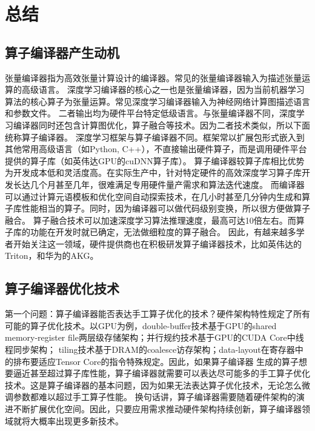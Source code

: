 
\chapter{总结}

\section{算子编译器产生动机}
张量编译器指为高效张量计算设计的编译器\cite{halide,kjolstad:2017:taco}。常见的张量编译器输入为描述张量运算的高级语言。
深度学习编译器\cite{tvm,rammer}的核心之一也是张量编译器，因为当前机器学习算法的核心算子为张量运算。常见深度学习编译器输入为神经网络计算图描述语言和参数文件。
二者输出均为硬件平台特定低级语言。与张量编译器不同，深度学习编译器同时还包含计算图优化，算子融合等技术。因为二者技术类似，所以下面统称算子编译器。
深度学习框架\cite{tensorflow,pytorch}与算子编译器不同。框架常以扩展包形式嵌入到其他常用高级语言（如Python, C++），不直接输出硬件算子，而是调用硬件平台提供的算子库（如英伟达GPU的cuDNN算子库\cite{cuDNN}）。
算子编译器较算子库相比优势为开发成本低和灵活度高。在实际生产中，针对特定硬件的高效深度学习算子库开发长达几个月甚至几年，很难满足专用硬件量产需求和算法迭代速度\cite{Heron}。
而编译器可以通过计算元语模板和优化空间自动探索技术，在几小时甚至几分钟内生成和算子库性能相当的算子\cite{Roller}。同时，因为编译器可以做代码级别变换，所以很方便做算子融合。
算子融合技术可以加速深度学习算法推理速度，最高可达10倍左右\cite{DNNFusion}。而算子库的功能在开发时就已确定，无法做细粒度的算子融合\cite{Graphene}。
因此，有越来越多学者开始关注这一领域\cite{PET,Tiramisu,Checkmate}，硬件提供商也在积极研发算子编译器技术，比如英伟达的Triton\cite{Triton}，和华为的AKG\cite{AKG}。

\section{算子编译器优化技术}
第一个问题：算子编译器能否表达手工算子优化的技术？硬件架构特性规定了所有可能的算子优化技术。以GPU为例，double-buffer技术基于GPU的shared memory-register file两层级存储架构\cite{double-buffer}；并行规约技术基于GPU的CUDA Core中线程同步架构\cite{parallel-reduction}；
tiling技术基于DRAM的coalesce访存架构\cite{coalesce}；data-layout在寄存器中的排布要适应Tensor Core的指令特殊规定\cite{DynamicNM}。因此，如果算子编译器
生成的算子想要逼近甚至超过算子库性能，算子编译器就需要可以表达尽可能多的手工算子优化技术。这是算子编译器的基本问题，因为如果无法表达算子优化技术，无论怎么微调参数都难以超过手工算子性能。
换句话讲，算子编译器需要随着硬件架构的演进不断扩展优化空间。因此，只要应用需求推动硬件架构持续创新，算子编译器领域就将大概率出现更多新技术。

